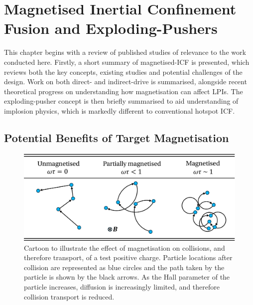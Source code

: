 \newpage

\section{Magnetised Inertial Confinement Fusion and Exploding-Pushers}%
\label{sec:Res2_MagICF}

This chapter begins with a review of published studies of relevance to the work conducted here.
Firstly, a short summary of magnetised-\ac{ICF} is presented, which reviews both the key concepts, existing studies and potential challenges of the design.
Work on both direct- and indirect-drive is summarised, alongside recent theoretical progress on understanding how magnetisation can affect \ac{LPIs}.
The exploding-pusher concept is then briefly summarised to aid understanding of implosion physics, which is markedly different to conventional hotspot \ac{ICF}.

\subsection{Potential Benefits of Target Magnetisation}%
\label{sec:Res2_magbenefits}

\begin{figure}[t!]
    \includegraphics[width=0.75\linewidth]{Results2/Images/wt_collisions.png}
    \centering
    \caption{Cartoon to illustrate the effect of magnetisation on collisions, and therefore transport, of a test positive charge.
    Particle locations after collision are represented as blue circles and the path taken by the particle is shown by the black arrows.
    As the Hall parameter of the particle increases, diffusion is increasingly limited, and therefore collision transport is reduced.}%
    \label{fig:Res2_omegatau}
\end{figure}

